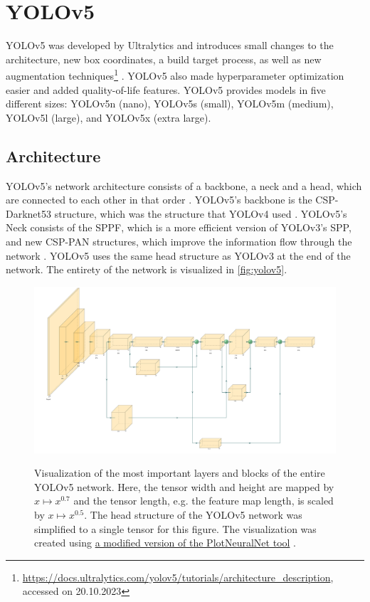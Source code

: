 \documentclass[10pt]{book}
\newcommand{\figureref}[1]{\autoref{#1}}
\begin{document}
\section{YOLOv5}

\ac{YOLO}v5 was developed by Ultralytics and introduces small changes to the architecture, new box coordinates, a build target process, as well as new augmentation techniques\footnote{\url{https://docs.ultralytics.com/yolov5/tutorials/architecture_description}, accessed on 20.10.2023} \cite{gjocher2022yolov5,terven2023comprehensive}. \ac{YOLO}v5 also made hyperparameter optimization easier and added quality-of-life features. \ac{YOLO}v5 provides models in five different sizes: \ac{YOLO}v5n (nano), \ac{YOLO}v5s (small), \ac{YOLO}v5m (medium), \ac{YOLO}v5l (large), and \ac{YOLO}v5x (extra large).

\subsection{Architecture}

\ac{YOLO}v5's network architecture consists of a backbone, a neck and a head, which are connected to each other in that order \cite{jani2023model}. \ac{YOLO}v5's backbone is the CSP-Darknet53 structure, which was the structure that \ac{YOLO}v4 used \cite{bochkovskiy2020yolov4}. \ac{YOLO}v5's Neck consists of the \ac{SPPF}, which is a more efficient version of \ac{YOLO}v3's \ac{SPP}, and new \ac{CSP-PAN} structures, which improve the information flow through the network \cite{liu2018path}. \ac{YOLO}v5 uses the same head structure as \ac{YOLO}v3 at the end of the network. The entirety of the network is visualized in \figureref{fig:yolov5}.

\begin{figure}
  \caption{Visualization of the most important layers and blocks of the entire \ac{YOLO}v5 network. Here, the tensor width and height are mapped by $x \mapsto x^{0.7}$ and the tensor length, e.g. the feature map length, is scaled by $x \mapsto x^{0.5}$. The head structure of the \ac{YOLO}v5 network was simplified to a single tensor for this figure. The visualization was created using \href{https://github.com/jnccd/PlotNeuralNet}{a modified version of the PlotNeuralNet tool} \cite{haris_iqbal_2018_2526396}.}
  \includegraphics[width=\textwidth]{image/yolov5}
  \label{fig:yolov5}
\end{figure}
\end{document}
